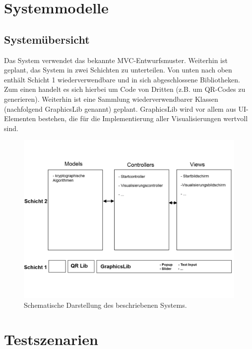 \documentclass{article}
\begin{document}
\section{Systemmodelle}

\subsection{Systemübersicht}
Das System verwendet das bekannte \gls{MVC}-Entwurfsmuster. Weiterhin ist geplant, das System in zwei Schichten zu unterteilen. Von unten nach oben enthält Schicht 1 wiederverwendbare und in sich abgeschlossene Bibliotheken. Zum einen handelt es sich hierbei um Code von Dritten (z.B. um QR-Codes zu generieren). Weiterhin ist eine Sammlung wiederverwendbarer Klassen (nachfolgend \gls{GraphicsLib} genannt) geplant. \gls{GraphicsLib} wird vor allem aus \gls{UI}-Elementen bestehen, die für die Implementierung aller Visualisierungen wertvoll sind.

\begin{figure}[H]
  \centering
    \includegraphics[width=\textwidth]{resources/systemmodel-draft}
  \caption{Schematische Darstellung des beschriebenen Systems.}
\end{figure}


\section{Testszenarien}
\end{document}
